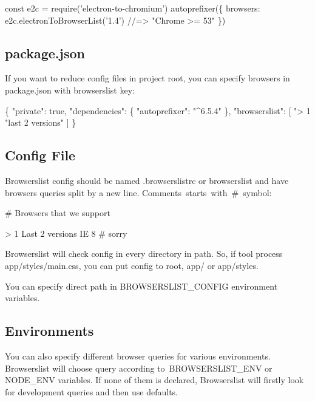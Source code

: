 \begin{DoxyCode}
const e2c = require('electron-to-chromium')
autoprefixer(\{
    browsers: e2c.electronToBrowserList('1.4') //=> "Chrome >= 53"
\})
\end{DoxyCode}


\subsection*{{\ttfamily package.\+json}}

If you want to reduce config files in project root, you can specify browsers in {\ttfamily package.\+json} with {\ttfamily browserslist} key\+:


\begin{DoxyCode}
\{
  "private": true,
  "dependencies": \{
    "autoprefixer": "^6.5.4"
  \},
  "browserslist": [
    "> 1%
    "last 2 versions"
  ]
\}
\end{DoxyCode}


\subsection*{Config File}

Browserslist config should be named {\ttfamily .browserslistrc} or {\ttfamily browserslist} and have browsers queries split by a new line. Comments starts with {\ttfamily \#} symbol\+:


\begin{DoxyCode}
# Browsers that we support

> 1%
Last 2 versions
IE 8 # sorry
\end{DoxyCode}


Browserslist will check config in every directory in {\ttfamily path}. So, if tool process {\ttfamily app/styles/main.\+css}, you can put config to root, {\ttfamily app/} or {\ttfamily app/styles}.

You can specify direct path in {\ttfamily B\+R\+O\+W\+S\+E\+R\+S\+L\+I\+S\+T\+\_\+\+C\+O\+N\+F\+IG} environment variables.

\subsection*{Environments}

You can also specify different browser queries for various environments. Browserslist will choose query according to {\ttfamily B\+R\+O\+W\+S\+E\+R\+S\+L\+I\+S\+T\+\_\+\+E\+NV} or {\ttfamily N\+O\+D\+E\+\_\+\+E\+NV} variables. If none of them is declared, Browserslist will firstly look for {\ttfamily development} queries and then use defaults.

